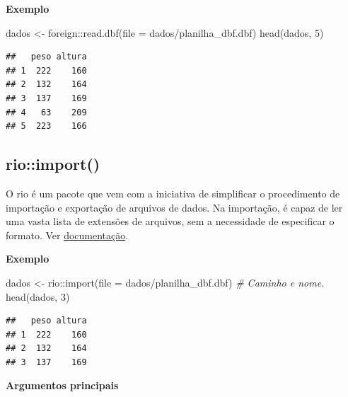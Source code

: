 \documentclass[
]{book}
\newenvironment{Shaded}{\begin{snugshade}}{\end{snugshade}}
\newcommand{\AttributeTok}[1]{\textcolor[rgb]{0.77,0.63,0.00}{#1}}
\newcommand{\CommentTok}[1]{\textcolor[rgb]{0.56,0.35,0.01}{\textit{#1}}}
\newcommand{\DecValTok}[1]{\textcolor[rgb]{0.00,0.00,0.81}{#1}}
\newcommand{\FunctionTok}[1]{\textcolor[rgb]{0.00,0.00,0.00}{#1}}
\newcommand{\NormalTok}[1]{#1}
\newcommand{\OtherTok}[1]{\textcolor[rgb]{0.56,0.35,0.01}{#1}}
\newcommand{\SpecialCharTok}[1]{\textcolor[rgb]{0.00,0.00,0.00}{#1}}
\newcommand{\StringTok}[1]{\textcolor[rgb]{0.31,0.60,0.02}{#1}}
\theoremstyle{definition}
\theoremstyle{definition}
\theoremstyle{definition}
\theoremstyle{definition}
\theoremstyle{remark}
\begin{document}
\textbf{Exemplo}

\begin{Shaded}
\begin{Highlighting}[]
\NormalTok{dados }\OtherTok{\textless{}{-}}\NormalTok{ foreign}\SpecialCharTok{::}\FunctionTok{read.dbf}\NormalTok{(}\AttributeTok{file =} \StringTok{\textquotesingle{}dados/planilha\_dbf.dbf\textquotesingle{}}\NormalTok{)}
\FunctionTok{head}\NormalTok{(dados, }\DecValTok{5}\NormalTok{)}
\end{Highlighting}
\end{Shaded}

\begin{verbatim}
##   peso altura
## 1  222    160
## 2  132    164
## 3  137    169
## 4   63    209
## 5  223    166
\end{verbatim}

\hypertarget{rioimport}{%
\subsection{rio::import()}\label{rioimport}}

O rio é um pacote que vem com a iniciativa de simplificar o procedimento de importação e exportação de arquivos de dados. Na importação, é capaz de ler uma vasta lista de extensões de arquivos, sem a necessidade de especificar o formato. Ver \href{https://www.rdocumentation.org/packages/rio/versions/0.5.29/topics/import}{documentação}.

\textbf{Exemplo}

\begin{Shaded}
\begin{Highlighting}[]
\NormalTok{dados }\OtherTok{\textless{}{-}}\NormalTok{ rio}\SpecialCharTok{::}\FunctionTok{import}\NormalTok{(}\AttributeTok{file =} \StringTok{\textquotesingle{}dados/planilha\_dbf.dbf\textquotesingle{}}\NormalTok{) }\CommentTok{\# Caminho e nome.}
\FunctionTok{head}\NormalTok{(dados, }\DecValTok{3}\NormalTok{)}
\end{Highlighting}
\end{Shaded}

\begin{verbatim}
##   peso altura
## 1  222    160
## 2  132    164
## 3  137    169
\end{verbatim}

\textbf{Argumentos principais}
\end{document}
